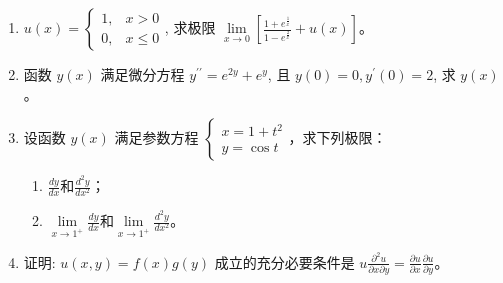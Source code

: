 \begin{enumerate}
\item 
$u(x)=\left\{\begin{array}{ll}1,& x>0 \\ 0,& x \leq 0\end{array}\right.$, 求极限 $\lim\limits _{x \rightarrow 0}\left[\frac{1+e^{\frac{1}{x}}}{1-e^{\frac{2}{x}}}+u(x)\right]$。



\item 
函数 $y(x)$ 满足微分方程 $y^{\prime \prime}=e^{2 y}+e^{y}$, 且 $y(0)=0, y^{\prime}(0)=2$, 求 $y(x)$。




\item 
设函数 $y(x)$ 满足参数方程 $\left\{\begin{array}{l}x=1+t^{2} \\ y=\cos t\end{array}\right.$，求下列极限：
\begin{enumerate}
	\item

 $ \frac{d y}{d x}$和$ \frac{d^{2} y}{d x^{2}}$；
\item 
$\lim\limits _{x \rightarrow 1^{+}} \frac{d y}{d x} $和$ \lim\limits _{x \rightarrow 1^{+}} \frac{d^{2} y}{d x^{2}}$。
\end{enumerate}




\item 
证明: $u(x, y)=f(x) g(y)$ 成立的充分必要条件是 $u \frac{\partial^{2} u}{\partial x \partial y}=\frac{\partial u}{\partial x} \frac{\partial u}{\partial y}$。



\end{enumerate}
